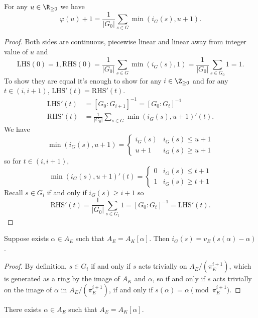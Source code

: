 \documentclass[a4paper]{article}
\begin{document}
\begin{lemma}
  For any \(u \in \R_{\geq 0}\) we have
  \[
    \varphi(u) + 1 = \frac{1}{|G_0|} \sum_{s \in G} \min(i_G(s), u + 1).
  \]
\end{lemma}

\begin{proof}
  Both sides are continuous, piecewise linear and linear away from integer value of \(u\) and
  \[
    \mathrm{LHS}(0) = 1, \mathrm{RHS}(0) = \frac{1}{|G_0|} \sum_{s \in G} \min(i_G(s), 1) = \frac{1}{|G_0|} \sum_{s \in G_0} 1 = 1.
  \]
  To show they are equal it's enough to show for any \(i \in \Z_{\geq 0}\) and for any \(t \in (i, i + 1)\), \(\mathrm{LHS}'(t) = \mathrm{RHS}'(t)\).
  \begin{align*}
    \mathrm{LHS}'(t) &= [G_0: G_{i + 1}]^{-1} = [G_0: G_t]^{-1} \\
    \mathrm{RHS}'(t) &= \frac{1}{|G_0|} \sum_{s \in G} \min(i_G(s), u + 1)'(t).
  \end{align*}
  We have
  \[
    \min(i_G(s), u + 1) =
    \begin{cases}
      i_G(s) & i_G(s) \leq u + 1 \\
      u + 1 & i_G(s) \geq u + 1
    \end{cases}
  \]
  so for \(t \in (i, i + 1)\),
  \[
    \min(i_G(s), u + 1)'(t) =
    \begin{cases}
      0 & i_G(s) \leq t + 1 \\
      1 & i_G(s) \geq t + 1
    \end{cases}
  \]
  Recall \(s \in G_i\) if and only if \(i_G(s) \geq i + 1\) so
  \[
    \mathrm{RHS}'(t) = \frac{1}{|G_0|} \sum_{s \in G_t} 1 = [G_0: G_t]^{-1} = \mathrm{LHS}'(t).
  \]
\end{proof}

\begin{lemma}
  Suppose exists \(\alpha \in A_E\) such that \(A_E = A_K[\alpha]\). Then \(i_G(s) = v_E(s(\alpha) - \alpha)\).
\end{lemma}

\begin{proof}
  By definition, \(s \in G_i\) if and only if \(s\) acts trivially on \(A_E/(\pi_E^{i + 1})\), which is generated as a ring by the image of \(A_K\) and \(\alpha\), so if and only if \(s\) acts trivially on the image of \(\alpha\) in \(A_E/(\pi_E^{i + 1})\), if and only if \(s(\alpha) = \alpha \pmod{\pi_E^{i + 1}}\).
\end{proof}

\begin{lemma}
  There exists \(\alpha \in A_E\) such that \(A_E = A_K[\alpha]\).
\end{lemma}
\end{document}
